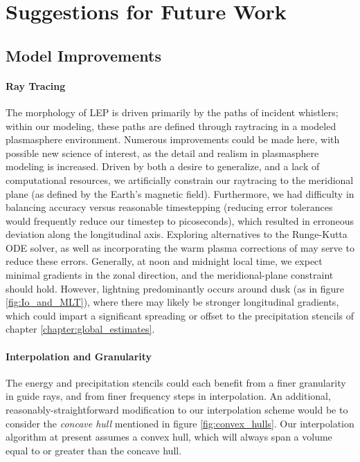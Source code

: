\section{Suggestions for Future Work}

\subsection{Model Improvements}
\paragraph{Ray Tracing}
The morphology of LEP is driven primarily by the paths of incident whistlers; within our modeling, these paths are defined through raytracing in a modeled plasmasphere environment. Numerous improvements could be made here, with possible new science of interest, as the detail and realism in plasmasphere modeling is increased. Driven by both a desire to generalize, and a lack of computational resources, we artificially constrain our raytracing to the meridional plane (as defined by the Earth's magnetic field). Furthermore, we had difficulty in balancing accuracy versus reasonable timestepping (reducing error tolerances would frequently reduce our timestep to picoseconds), which resulted in erroneous deviation along the longitudinal axis. Exploring alternatives to the Runge-Kutta ODE solver, as well as incorporating the warm plasma corrections of 
\cite{Maxworth2017} may serve to reduce these errors.
Generally, at noon and midnight local time, we expect minimal gradients in the zonal direction, and the meridional-plane constraint should hold. However, lightning predominantly occurs around dusk (as in figure \ref{fig:Io_and_MLT}), where there may likely be stronger longitudinal gradients, which could impart a significant spreading or offset to the precipitation stencils of chapter \ref{chapter:global_estimates}. %

\paragraph{Interpolation and Granularity}
The energy and precipitation stencils could each benefit from a finer granularity in guide rays, and from finer frequency steps in interpolation. An additional, reasonably-straightforward modification to our interpolation scheme would be to consider the \emph{concave hull} mentioned in figure \ref{fig:convex_hulls}. Our interpolation algorithm at present assumes a convex hull, which will always span a volume equal to or greater than the concave hull.

